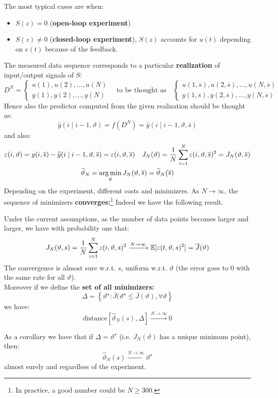 The most typical cases are when:
\begin{itemize}
	\item $S(z)=0$ (\textbf{open-loop experiment})
	\item $S(z)\neq 0$ (\textbf{closed-loop experiment}), $S(z)$ accounts for $u(t)$ depending on $e(t)$ because of the feedback.
\end{itemize}
The measured data sequence corresponds to a particular \textbf{realization} of input/output signals of $S$:
\[
	D^{N}=
	\begin{cases}
	 	u(1),u(2),\ldots,u(N)\\
	 	y(1),y(2),\ldots,y(N)
	\end{cases}
	\quad
	\text{to be thought as}
	\quad
	\begin{cases}
	 	u(1,\overline{s}),u(2,\overline{s}),\ldots,u(N,\overline{s})\\
	 	y(1,\overline{s}),y(2,\overline{s}),\ldots,y(N,\overline{s})
	\end{cases}
\]
Hence also the predictor computed from the given realization should be thought as:
\[
	\hat{y}(i\mid i-1,\vartheta) = f(D^{N}) = \hat{y}(i\mid i-1,\vartheta,\overline{s})
\]
and also:
\begin{gather*}
	\varepsilon(i,\vartheta) = y(i,\overline{s}) - \widehat{y}(i\mid i-1,\vartheta,\overline{s}) = \varepsilon(i,\vartheta,\overline{s})
	\quad
	J_{N}(\vartheta) = \frac{1}{N}\sum_{i=1}^{N} \varepsilon(i,\vartheta,\overline{s})^2 = J_{N}(\vartheta,\overline{s})\\
	\widehat{\vartheta}_{N} = \operatorname*{arg\,min}_{\vartheta} J_{N}(\vartheta,\overline{s}) = \widehat{\vartheta}_{N}(\overline{s})
\end{gather*}
Depending on the experiment, different costs and minimizers. As $N\to \infty$, the sequence of minimizers \textbf{converges:}\footnote{In practice, a good number could be $N\geq 300$.}
Indeed we have the following result.
\begin{theorem}
	Under the current assumptions, as the number of data points becomes larger and larger, we have with probability one that:
	\[
		J_{N}(\vartheta,s) = \frac{1}{N}\sum_{i=1}^{N} \varepsilon(i,\vartheta,s)^2 \xrightarrow{N\to\infty} \mathbb{E}[\varepsilon(t,\vartheta,s)^2] = \overline{J}(\vartheta)
	\]
	The convergence is almost sure w.r.t. $s$, uniform w.r.t. $\vartheta$ (the error goes to $0$ with the same rate for all $\vartheta$).\\
	Moreover if we define the \textbf{set of all minimizers:}
	\[
		\Delta = \left\{ \vartheta ^{\star} : \overline{J}(\vartheta ^{\star}\le \overline{J}(\vartheta),\forall \vartheta  \right\}
	\]
	we have:
	\[
		\text{distance}[\hat{\vartheta}_{N}(s), \Delta]\xrightarrow{N\to\infty} 0
	\]
\end{theorem}
As a corollary we have that if $\Delta ={\vartheta ^{\star} }$ (i.e. $J_{N}(\vartheta)$ has a unique minimum point), then:
\[
	\hat{\vartheta}_{N}(s) \xrightarrow{N\to\infty} \vartheta ^{\star} 
\]
almost surely and regardless of the experiment.

